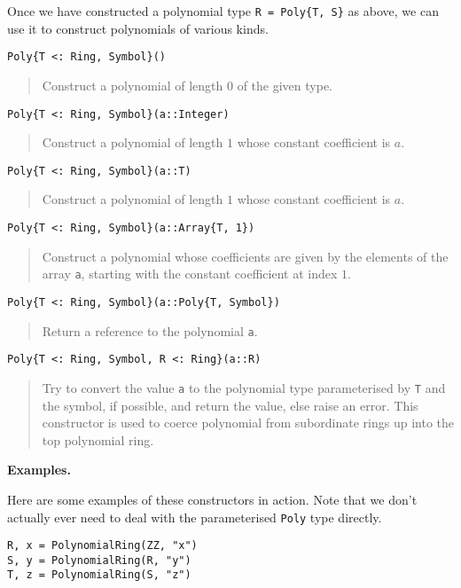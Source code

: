 \documentclass[a4paper,10pt]{article}
\newcommand{\code}{\lstinline}
\newcommand{\desc}[1]{\vspace{-3mm}\begin{quote}#1\end{quote}}
\begin{document}
{{{Once we have constructed a polynomial type \code|R = Poly{T, S}| as above, we can
use it to construct polynomials of various kinds.

\begin{lstlisting}
Poly{T <: Ring, Symbol}()
\end{lstlisting}

\desc{Construct a polynomial of length $0$ of the given type.}

\begin{lstlisting}
Poly{T <: Ring, Symbol}(a::Integer)
\end{lstlisting}

\desc{Construct a polynomial of length $1$ whose constant coefficient is $a$.}

\begin{lstlisting}
Poly{T <: Ring, Symbol}(a::T)
\end{lstlisting}

\desc{Construct a polynomial of length $1$ whose constant coefficient is $a$.}

\begin{lstlisting}
Poly{T <: Ring, Symbol}(a::Array{T, 1})
\end{lstlisting}

\desc{Construct a polynomial whose coefficients are given by the elements of the array
\code{a}, starting with the constant coefficient at index $1$.}

\begin{lstlisting}
Poly{T <: Ring, Symbol}(a::Poly{T, Symbol})
\end{lstlisting}

\desc{Return a reference to the polynomial \code{a}.}

\begin{lstlisting}
Poly{T <: Ring, Symbol, R <: Ring}(a::R)
\end{lstlisting}

\desc{Try to convert the value \code{a} to the polynomial type parameterised by 
\code{T} and the symbol, if possible, and return the value, else raise an error. 
This constructor is used to coerce polynomial from subordinate rings up into the
top polynomial ring.}

\textbf{Examples.}

Here are some examples of these constructors in action. Note that we don't actually
ever need to deal with the parameterised \code{Poly} type directly.

\begin{lstlisting}
R, x = PolynomialRing(ZZ, "x")
S, y = PolynomialRing(R, "y")
T, z = PolynomialRing(S, "z")


\end{lstlisting}}}}
\end{document}
